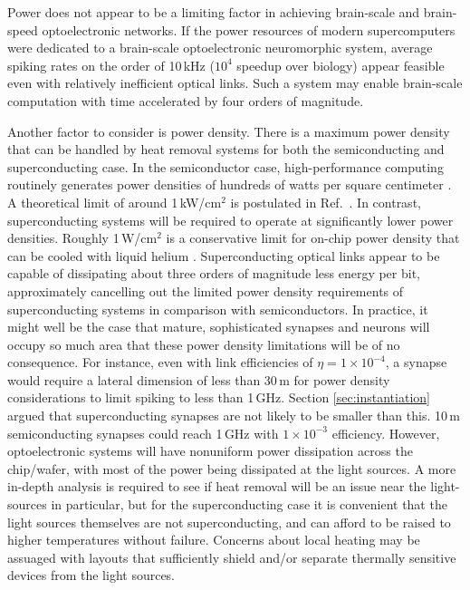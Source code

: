 \documentclass[twocolumn]{article}
\newcommand{\onlinecite}[1]{\hspace{-1 ex} \nocite{#1}\citenum{#1}}
\begin{document}
Power does not appear to be a limiting factor in achieving brain-scale and brain-speed optoelectronic networks. If the power resources of modern supercomputers were dedicated to a brain-scale optoelectronic neuromorphic system, average spiking rates on the order of 10\,kHz ($10^{4}$ speedup over biology) appear feasible even with relatively inefficient optical links. Such a system may enable brain-scale computation with time accelerated by four orders of magnitude.

Another factor to consider is power density. There is a maximum power density that can be handled by heat removal systems for both the semiconducting and superconducting case. In the semiconductor case, high-performance computing routinely generates power densities of hundreds of watts per square centimeter \cite{tolpygo2016superconductor}. A theoretical limit of around 1\,kW/cm$^2$ is postulated in Ref.\,\onlinecite{zhirnov2003limits}. In contrast, superconducting systems will be required to operate at significantly lower power densities. Roughly 1\,W/cm$^2$ is a conservative limit for on-chip power density that can be cooled with liquid helium \cite{tolpygo2016superconductor}. Superconducting optical links appear to be capable of dissipating about three orders of magnitude less energy per bit, approximately cancelling out the limited power density requirements of superconducting systems in comparison with semiconductors. In practice, it might well be the case that mature, sophisticated synapses and neurons will occupy so much area that these power density limitations will be of no consequence. For instance, even with link efficiencies of $\eta = 1 \times 10^{-4}$, a synapse would require a lateral dimension of less than 30\,\textmu m for power density considerations to limit spiking to less than 1\,GHz. Section \ref{sec:instantiation} argued that superconducting synapses are not likely to be smaller than this. 10\,\textmu m semiconducting synapses could reach 1\,GHz with $1 \times 10^{-3}$ efficiency. However, optoelectronic systems will have nonuniform power dissipation across the chip/wafer, with most of the power being dissipated at the light sources. A more in-depth analysis is required to see if heat removal will be an issue near the light-sources in particular, but for the superconducting case it is convenient that the light sources themselves are not superconducting, and can afford to be raised to higher temperatures without failure. Concerns about local heating may be assuaged with layouts that sufficiently shield and/or separate thermally sensitive devices from the light sources.
\end{document}
